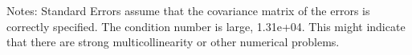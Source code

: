 Notes: \newline
 [1] Standard Errors assume that the covariance matrix of the errors is correctly specified. \newline
 [2] The condition number is large, 1.31e+04. This might indicate that there are \newline
 strong multicollinearity or other numerical problems.